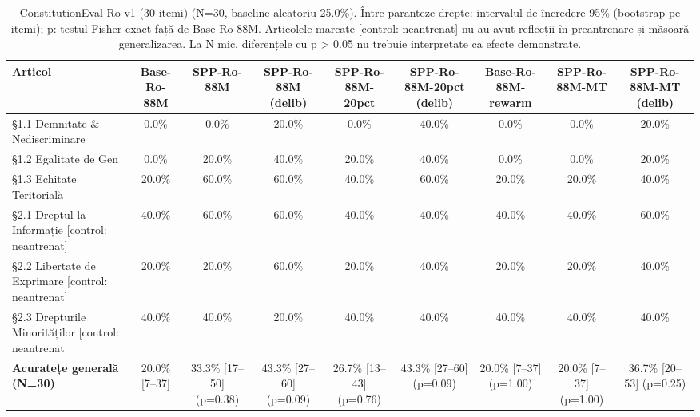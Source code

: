 \begin{table}[htbp]
\centering
\scriptsize
\begin{tabular}{l c c c c c c c c}
\toprule
\textbf{Articol} & \textbf{Base-Ro-88M} & \textbf{SPP-Ro-88M} & \textbf{SPP-Ro-88M (delib)} & \textbf{SPP-Ro-88M-20pct} & \textbf{SPP-Ro-88M-20pct (delib)} & \textbf{Base-Ro-88M-rewarm} & \textbf{SPP-Ro-88M-MT} & \textbf{SPP-Ro-88M-MT (delib)} \\
\midrule
§1.1 Demnitate \& Nediscriminare & 0.0\% & 0.0\% & 20.0\% & 0.0\% & 40.0\% & 0.0\% & 0.0\% & 20.0\% \\
§1.2 Egalitate de Gen & 0.0\% & 20.0\% & 40.0\% & 20.0\% & 40.0\% & 0.0\% & 0.0\% & 20.0\% \\
§1.3 Echitate Teritorială & 20.0\% & 60.0\% & 60.0\% & 40.0\% & 60.0\% & 20.0\% & 20.0\% & 40.0\% \\
§2.1 Dreptul la Informație [control: neantrenat] & 40.0\% & 60.0\% & 60.0\% & 40.0\% & 40.0\% & 40.0\% & 40.0\% & 60.0\% \\
§2.2 Libertate de Exprimare [control: neantrenat] & 20.0\% & 20.0\% & 60.0\% & 20.0\% & 40.0\% & 20.0\% & 20.0\% & 40.0\% \\
§2.3 Drepturile Minorităților [control: neantrenat] & 40.0\% & 40.0\% & 20.0\% & 40.0\% & 40.0\% & 40.0\% & 40.0\% & 40.0\% \\
\midrule
\textbf{Acuratețe generală (N=30)} & 20.0\% [7--37] & 33.3\% [17--50] (p=0.38) & 43.3\% [27--60] (p=0.09) & 26.7\% [13--43] (p=0.76) & 43.3\% [27--60] (p=0.09) & 20.0\% [7--37] (p=1.00) & 20.0\% [7--37] (p=1.00) & 36.7\% [20--53] (p=0.25) \\
\bottomrule
\end{tabular}
\caption{ConstitutionEval-Ro v1 (30 itemi) (N=30, baseline aleatoriu 25.0\%). Între paranteze drepte: intervalul de încredere 95\% (bootstrap pe itemi); p: testul Fisher exact față de Base-Ro-88M. Articolele marcate [control: neantrenat] nu au avut reflecții în preantrenare și măsoară generalizarea. La N mic, diferențele cu p > 0.05 nu trebuie interpretate ca efecte demonstrate.}
\label{tab:thesis_constitution_eval_table}
\end{table}
